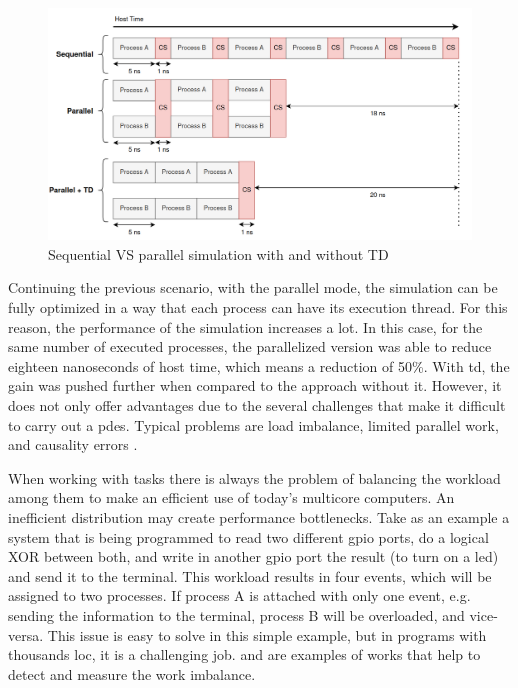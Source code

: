 \begin{figure}[H]
	\centering
 	\includegraphics[width=1\linewidth]{Images/ParallelSimulation.png}
 	\caption{Sequential VS parallel simulation with and without TD}
	 \label{fig_ParallelSimulation}
\end{figure}

Continuing the previous scenario, with the parallel mode, the simulation can be fully optimized in a way that each process can have its 
execution thread. For this reason, the performance of the simulation increases a lot. In this case, for the same number of executed processes, 
the parallelized version was able to reduce eighteen nanoseconds of host time, which means a reduction of 50\%. With \gls{td}, the gain was 
pushed further when compared to the approach without it. However, it does not only offer advantages due to the 
several challenges that make it difficult to carry out a \gls{pdes}. Typical problems are load imbalance, limited parallel work, and causality 
errors \cite{yoga2019parallelism} \cite{zhou1992sequential}. 

When working with tasks there is always the problem of balancing the workload among them to make an efficient use of today's multicore 
computers. An inefficient distribution may create performance bottlenecks. Take as an example a system that is being programmed to read two different 
\gls{gpio} ports, do a logical XOR between both, and write in another \gls{gpio} port the result (to turn on a \gls{led}) and send it to 
the terminal. This workload results in four events, which will be assigned to two processes. If process A is attached with only one event, 
e.g. sending the information to the terminal, process B will be overloaded, and vice-versa. This issue is easy to solve in this simple 
example, but in programs with thousands \gls{loc}, it is a challenging job. \cite{loadImbalance1} and \cite{loadImbalance2} are examples of 
works that help to detect and measure the work imbalance.

